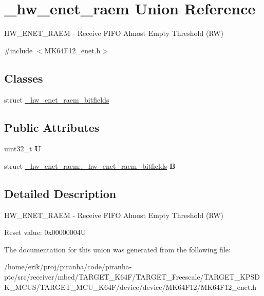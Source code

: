 \hypertarget{union__hw__enet__raem}{}\section{\+\_\+hw\+\_\+enet\+\_\+raem Union Reference}
\label{union__hw__enet__raem}


H\+W\+\_\+\+E\+N\+E\+T\+\_\+\+R\+A\+EM -\/ Receive F\+I\+FO Almost Empty Threshold (RW)  




{\ttfamily \#include $<$M\+K64\+F12\+\_\+enet.\+h$>$}

\subsection*{Classes}
\begin{DoxyCompactItemize}
\item 
struct \hyperlink{struct__hw__enet__raem_1_1__hw__enet__raem__bitfields}{\+\_\+hw\+\_\+enet\+\_\+raem\+\_\+bitfields}
\end{DoxyCompactItemize}
\subsection*{Public Attributes}
\begin{DoxyCompactItemize}
\item 
uint32\+\_\+t {\bfseries U}\hypertarget{union__hw__enet__raem_a4facea8c3214ac78fd925ad133203d44}{}\label{union__hw__enet__raem_a4facea8c3214ac78fd925ad133203d44}

\item 
struct \hyperlink{struct__hw__enet__raem_1_1__hw__enet__raem__bitfields}{\+\_\+hw\+\_\+enet\+\_\+raem\+::\+\_\+hw\+\_\+enet\+\_\+raem\+\_\+bitfields} {\bfseries B}\hypertarget{union__hw__enet__raem_aafe69348e78fe84138ed2deb7c481321}{}\label{union__hw__enet__raem_aafe69348e78fe84138ed2deb7c481321}

\end{DoxyCompactItemize}


\subsection{Detailed Description}
H\+W\+\_\+\+E\+N\+E\+T\+\_\+\+R\+A\+EM -\/ Receive F\+I\+FO Almost Empty Threshold (RW) 

Reset value\+: 0x00000004U 

The documentation for this union was generated from the following file\+:\begin{DoxyCompactItemize}
\item 
/home/erik/proj/piranha/code/piranha-\/ptc/src/receiver/mbed/\+T\+A\+R\+G\+E\+T\+\_\+\+K64\+F/\+T\+A\+R\+G\+E\+T\+\_\+\+Freescale/\+T\+A\+R\+G\+E\+T\+\_\+\+K\+P\+S\+D\+K\+\_\+\+M\+C\+U\+S/\+T\+A\+R\+G\+E\+T\+\_\+\+M\+C\+U\+\_\+\+K64\+F/device/device/\+M\+K64\+F12/M\+K64\+F12\+\_\+enet.\+h\end{DoxyCompactItemize}
